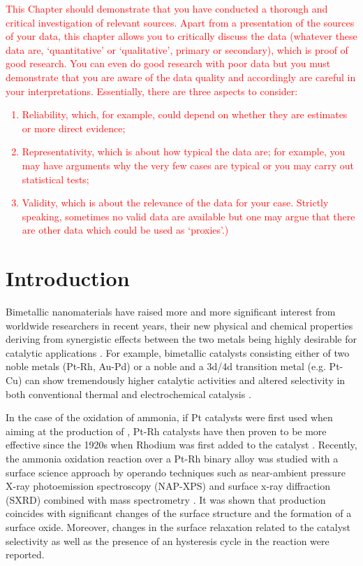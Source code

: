 \textcolor{red}{This Chapter should demonstrate that you have conducted a thorough and critical investigation of relevant sources.
Apart from a presentation of the sources of your data, this chapter allows you to critically discuss the data (whatever these data are, ‘quantitative’ or ‘qualitative’, primary or secondary), which is proof of good research. You can even do good research with poor data but you must demonstrate that you are aware of the data quality and accordingly are careful in your interpretations. Essentially, there are three aspects to consider:
\begin{enumerate}
\item	Reliability, which, for example, could depend on whether they are estimates or more direct evidence;
\item	Representativity, which is about how typical the data are; for example, you may have arguments why the very few cases are typical or you may carry out statistical tests;
\item Validity, which is about the relevance of the data for your case. Strictly speaking, sometimes no valid data are available but one may argue that there are other data which could be used as ‘proxies’.)
\end{enumerate}
}

\section{Introduction}

Bimetallic nanomaterials have raised more and more significant interest from worldwide researchers in recent years, their new physical and chemical properties deriving from synergistic effects between the two metals being highly desirable for catalytic applications \cite{}.
For example, bimetallic catalysts consisting either of two noble metals (Pt-Rh, Au-Pd) or a noble and a 3d/4d transition metal (e.g. Pt-Cu) can show tremendously higher catalytic activities and altered selectivity in both conventional thermal and electrochemical catalysis \parencite{Resta2020a, Carnis2021b}.

In the case of the oxidation of ammonia, if Pt catalysts were first used when aiming at the production of \nitricoxide, Pt-Rh catalysts have then proven to be more effective since the 1920s when Rhodium was first added to the catalyst \parencite{Handforth1934, Heck1982}.
Recently, the ammonia oxidation reaction over a Pt-Rh binary alloy was studied with a surface science approach by operando techniques such as near-ambient pressure X-ray photoemission spectroscopy (NAP-XPS) and surface x-ray diffraction (SXRD) combined with mass spectrometry \parencite{Resta2020a}.
It was shown that \nitricoxide production coincides with significant changes of the surface structure and the formation of a  surface oxide.
Moreover, changes in the surface relaxation related to the catalyst selectivity as well as the presence of an hysteresis cycle in the reaction were reported.

